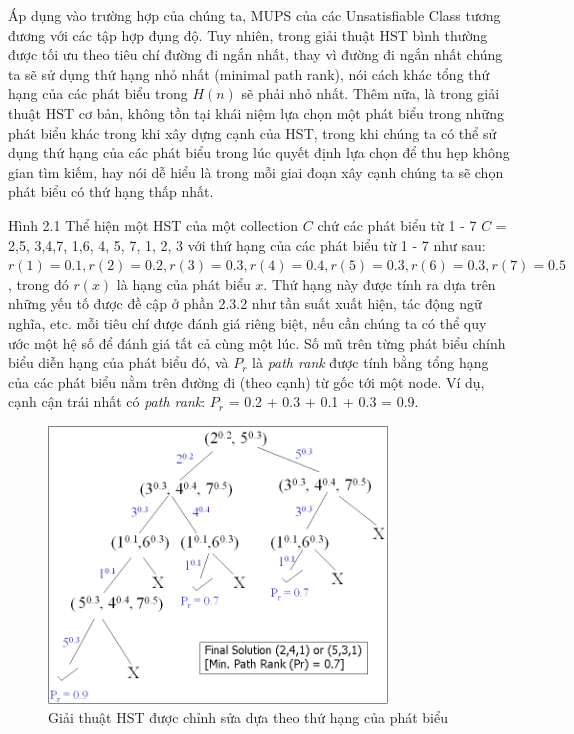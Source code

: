 	\hspace*{.05\textwidth} Áp dụng vào trường hợp của chúng ta, MUPS của các Unsatisfiable Class tương đương với các tập hợp đụng độ. Tuy nhiên, trong giải thuật HST bình thường được tối ưu theo tiêu chí đường đi ngắn nhất, thay vì đường đi ngắn nhất chúng ta sẽ sử dụng thứ hạng nhỏ nhất (minimal path rank), nói cách khác tổng thứ hạng của các phát biểu trong $H(n)$ sẽ phải nhỏ nhất. Thêm nữa, là trong giải thuật HST cơ bản, không tồn tại khái niệm lựa chọn một phát biểu trong những phát biểu khác trong khi xây dựng cạnh của HST, trong khi chúng ta có thể sử dụng thứ hạng của các phát biểu trong lúc quyết định lựa chọn để thu hẹp không gian tìm kiếm, hay nói dễ hiểu là trong mỗi giai đoạn xây cạnh chúng ta sẽ chọn phát biểu có thứ hạng thấp nhất.
	
	\hspace*{.05\textwidth} Hình 2.1 Thể hiện một HST của một collection $C$ chứ các phát biểu từ 1 - 7  $C$ = {{2,5}, {3,4,7}, {1,6}, {4, 5, 7}, {1, 2, 3}} với thứ hạng của các phát biểu từ 1 - 7 như sau: $r(1) = 0.1, r(2) = 0.2, r(3) = 0.3, r(4) = 0.4, r(5) = 0.3, r(6) = 0.3, r(7) = 0.5$, trong đó $r(x)$ là hạng của phát biểu $x$. Thứ hạng này được tính ra dựa trên những yếu tố được đề cập ở phần 2.3.2 như tần suất xuất hiện, tác động ngữ nghĩa, etc. mỗi tiêu chí được đánh giá riêng biệt, nếu cần chúng ta có thể quy ước một hệ số để đánh giá tất cả cùng một lúc. Số mũ trên từng phát biểu chính biểu diễn hạng của phát biểu đó, và $P_{r}$ là \textit{path rank} được tính bằng tổng hạng của các phát biểu nằm trên đường đi (theo cạnh) từ gốc tới một node. Ví dụ, cạnh cận trái nhất có \textit{path rank}: $P_{r}$ = 0.2 + 0.3 + 0.1 + 0.3 = 0.9.
	\begin{figure}[ht!]
			\centering
			\includegraphics[width=90mm]{Figures/fig1.png}
			\caption{Giải thuật HST được chỉnh sửa dựa theo thứ hạng của phát biểu \label{overflow}}
	\end{figure}
	
